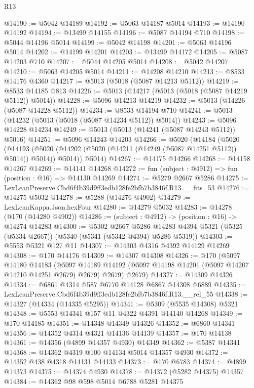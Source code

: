 \begin{lexlean}{R13}
\begin{coremodule}
@14190 := @5042 @14189
@14192 := @5063 @14187 @5014
@14193 := @14190 @14192
@14194 := @13499 @14155
@14196 := @5087 @14194 @710
@14198 := @5044 @14196 @5014
@14199 := @5042 @14198
@14201 := @5063 @14196 @5014
@14202 := @14199 @14201
@14203 := @13499 @14172
@14205 := @5087 @14203 @710
@14207 := @5044 @14205 @5014
@14208 := @5042 @14207
@14210 := @5063 @14205 @5014
@14211 := @14208 @14210
@14213 := @8533 @14176 @4360
@14217 := @5013 (@5018 (@5087 @14213 @5112))
@14219 := @8533 @14185 @813
@14226 := @5013 (@14217 (@5013 (@5018 (@5087 @14219 @5112)) @5014))
@14228 := @5096 @14213 @14219
@14232 := @5013 (@14226 (@5087 @14228 @5112))
@14234 := @8533 @14194 @710
@14241 := @5013 (@14232 (@5013 (@5018 (@5087 @14234 @5112)) @5014))
@14243 := @5096 @14228 @14234
@14249 := @5013 (@5013 (@14241 (@5087 @14243 @5112)) @5016)
@14251 := @5096 @14243 @14203
@14266 := @5020
    (@14184
      (@5020
        (@14193 (@5020 (@14202 (@5020 (@14211 (@14249 (@5087 @14251 @5112)) @5014)) @5014)) @5014))
      @5014)
@14267 := @14175 @14266
@14268 := @14158 @14267
@14269 := @14141 @14268
@14272 := fun (subject : @4912) => fun (position : @16) => @14130 @14269
@14274 := @5279 @2667 @5286
@14275 := LexLeanPreserve.Cbd6f4b39d9ff3edb128fe2bfb7b3846f.R13.__fits_53
@14276 := @14275 @5032
@14278 := @5288 (@14276 @4902)
@14279 := LexLeanKappa.Json.hexFour
@14280 := @14279 @5032
@14283 := @14278 (@170 (@14280 @4902))
@14286 := (subject : @4912) -> (position : @16) -> @14274 @14283
@14300 := @5302
    @2667
    @5286
    @14283
    @4394
    @5321
    (@5325 (@5334 @2667))
    (@5340 (@5341 (@5342 @4394) @5286 @5319))
@14303 := @5553 @5321 @127 @11
@14307 := @14303 @4316 @4392 @14129 @14269
@14308 := @170 @14176
@14309 := @14307 @14308
@14326 := @170
    (@5097
      @14180
      @14183
      (@5097 @14189 @14192 (@5097 @14198 @14201 (@5097 @14207 @14210 @14251 @2679) @2679) @2679)
      @2679)
@14327 := @14309 @14326
@14334 := @6861 @4314 @587 @6770 @14128 @6867 @14308 @6889
@14335 := LexLeanPreserve.Cbd6f4b39d9ff3edb128fe2bfb7b3846f.R13.__rel_55
@14338 := @14327 (@14334 (@14335 @5295))
@14341 := @5309 (@5535 @14308) @5321
@14348 := @5553 @14341 @157 @11 @4322 @4391 @14140 @14268
@14349 := @170 @14185
@14351 := @14348 @14349 @14326
@14352 := @6860 @14341
@14356 := @14352 @4314 @4321 @14136 @14139
@14357 := @170 @14138
@14361 := @14356 (@4899 @14357 @4930) @14349
@14362 := @5387 @14341
@14368 := @14362 @4319 @100 @14134 @5014 @14357 @4930
@14372 := @14352 @438 @4318 @14131 @14133
@14373 := @170 @6783
@14374 := @4899 @14373
@14375 := @14374 @4930
@14378 := @14372 (@5282 @14375) @14357
@14384 := @14362 @98 @598 @5014 @6788 @5281 @14375

\end{coremodule}
\end{lexlean}
